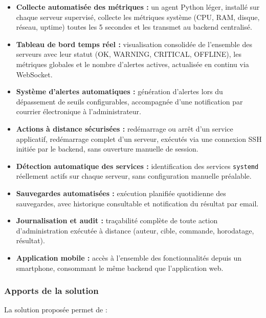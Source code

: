 \begin{itemize}[label=]
\item \textbf{Collecte automatisée des métriques :} un agent Python léger, installé sur
      chaque serveur supervisé, collecte les métriques système (CPU, RAM, disque,
      réseau, uptime) toutes les 5 secondes et les transmet au backend centralisé.

\item \textbf{Tableau de bord temps réel :} visualisation consolidée de l'ensemble des
      serveurs avec leur statut (OK, WARNING, CRITICAL, OFFLINE), les métriques
      globales et le nombre d'alertes actives, actualisée en continu via WebSocket.

\item \textbf{Système d'alertes automatiques :} génération d'alertes lors du dépassement
      de seuils configurables, accompagnée d'une notification par courrier électronique
      à l'administrateur.

\item \textbf{Actions à distance sécurisées :} redémarrage ou arrêt d'un service
      applicatif, redémarrage complet d'un serveur, exécutés via une connexion SSH
      initiée par le backend, sans ouverture manuelle de session.

\item \textbf{Détection automatique des services :} identification des services
      \texttt{systemd} réellement actifs sur chaque serveur, sans configuration manuelle
      préalable.

\item \textbf{Sauvegardes automatisées :} exécution planifiée quotidienne des
      sauvegardes, avec historique consultable et notification du résultat par email.

\item \textbf{Journalisation et audit :} traçabilité complète de toute action
      d'administration exécutée à distance (auteur, cible, commande, horodatage,
      résultat).

\item \textbf{Application mobile :} accès à l'ensemble des fonctionnalités depuis un
      smartphone, consommant le même backend que l'application web.
\end{itemize}

\subsubsection*{Apports de la solution}
La solution proposée permet de :

